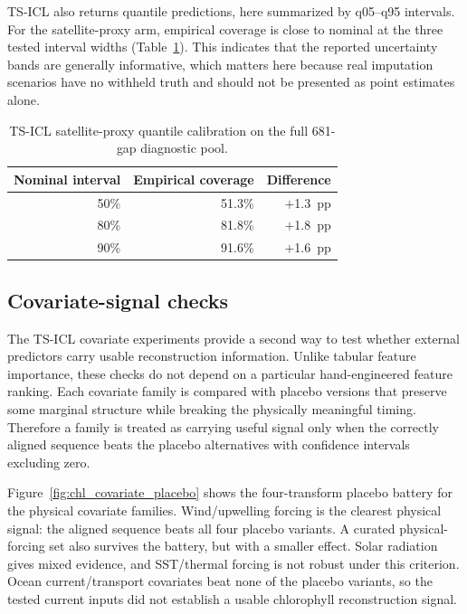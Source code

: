 TS-ICL also returns quantile predictions, here summarized by q05--q95 intervals. For the satellite-proxy
arm, empirical coverage is close to nominal at the three tested interval widths (Table~\ref{tab:tsicl_calibration}). This indicates that the reported uncertainty bands are generally informative, which matters here because real imputation scenarios have no withheld truth and should not be presented as point estimates alone.

\begin{table}[h]
  \centering
  \caption{TS-ICL satellite-proxy quantile calibration on the full 681-gap diagnostic pool.}
  \label{tab:tsicl_calibration}
  \begin{tabular}{rrr}
    \toprule
    Nominal interval & Empirical coverage & Difference \\
    \midrule
    50\% & 51.3\% & $+$1.3~pp \\
    80\% & 81.8\% & $+$1.8~pp \\
    90\% & 91.6\% & $+$1.6~pp \\
    \bottomrule
  \end{tabular}
\end{table}

\subsection{Covariate-signal checks}
\label{sec:chl_covariate_probe}

The TS-ICL covariate experiments provide a second way to test whether external predictors carry
usable reconstruction information. Unlike tabular feature importance, these checks do not depend
on a particular hand-engineered feature ranking. Each covariate
family is compared with placebo versions that preserve some marginal structure while breaking
the physically meaningful timing. Therefore a family is treated as carrying useful signal only
when the correctly aligned sequence beats the placebo alternatives with confidence intervals excluding zero.

Figure~\ref{fig:chl_covariate_placebo} shows the four-transform placebo battery for the physical
covariate families. Wind/upwelling forcing is the clearest physical signal: the aligned sequence
beats all four placebo variants. A curated physical-forcing set also survives the battery, but
with a smaller effect. Solar radiation gives mixed evidence, and SST/thermal forcing is not
robust under this criterion. Ocean current/transport covariates beat none of the placebo
variants, so the tested current inputs did not establish a usable chlorophyll reconstruction signal.

